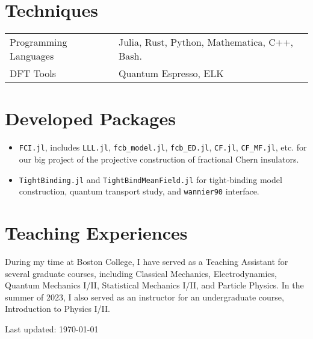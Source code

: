 \documentclass[10pt, letterpaper]{article}
\begin{document}
\section*{Techniques}
    \begin{tabular}{ll}
        Programming Languages & Julia, Rust, Python, Mathematica, C++, Bash.\\
        DFT Tools & Quantum Espresso, ELK\\
    \end{tabular}

\section*{Developed Packages}
    \begin{itemize}
        \item \texttt{FCI.jl}, includes \texttt{LLL.jl}, \texttt{fcb\_model.jl}, \texttt{fcb\_ED.jl}, \texttt{CF.jl}, \texttt{CF\_MF.jl}, etc. for our big project of the projective construction of fractional Chern insulators.
        \item \texttt{TightBinding.jl} and \texttt{TightBindMeanField.jl} for tight-binding model construction, quantum transport study, and \texttt{wannier90} interface.
    \end{itemize}



\section*{Teaching Experiences}
    During my time at Boston College, I have served as a Teaching Assistant for several graduate courses, including Classical Mechanics, Electrodynamics, Quantum Mechanics I/II, Statistical Mechanics I/II, and Particle Physics. In the summer of 2023, I also served as an instructor for an undergraduate course, Introduction to Physics I/II.



\begin{center}
  \begin{footnotesize}
    Last updated: \today 
  \end{footnotesize}
\end{center}
\end{document}
